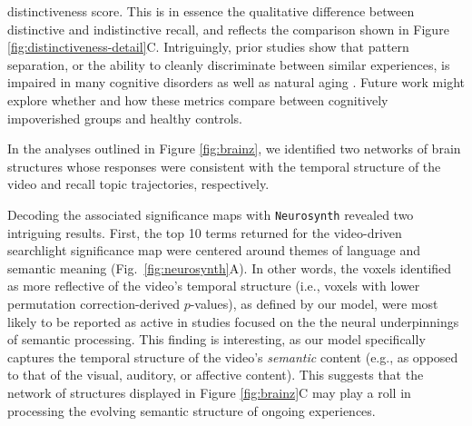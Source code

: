 \documentclass{article}
\begin{document}
distinctiveness score.  This is in essence the qualitative difference between distinctive and indistinctive recall, and reflects the comparison shown in Figure \ref{fig:distinctiveness-detail}C.  Intriguingly, prior studies show that pattern separation, or the ability to cleanly discriminate between similar experiences, is impaired in many cognitive disorders as well as natural aging \citep{StarEtal10, YassEtal11c, YassStar11b}.  Future work might explore whether and how these metrics compare between cognitively impoverished groups and healthy controls.

In the analyses outlined in Figure \ref{fig:brainz}, we identified two networks of brain structures whose responses were consistent with the temporal structure of the video and recall topic trajectories, respectively.


Decoding the associated significance maps with \texttt{Neurosynth} revealed two intriguing results.  First, the top 10 terms returned for the video-driven searchlight significance map were centered around themes of language and semantic meaning (Fig.~\ref{fig:neurosynth}A).  In other words, the voxels identified as more reflective of the video's temporal structure (i.e., voxels with lower permutation correction-derived $p$-values), as defined by our model, were most likely to be reported as active in studies focused on the the neural underpinnings of semantic processing.  This finding is interesting, as our model specifically captures the temporal structure of the video's \textit{semantic} content (e.g., as opposed to that of the visual, auditory, or affective content).  This suggests that the network of structures displayed in Figure \ref{fig:brainz}C may play a roll in processing the evolving semantic structure of ongoing experiences.
\end{document}
